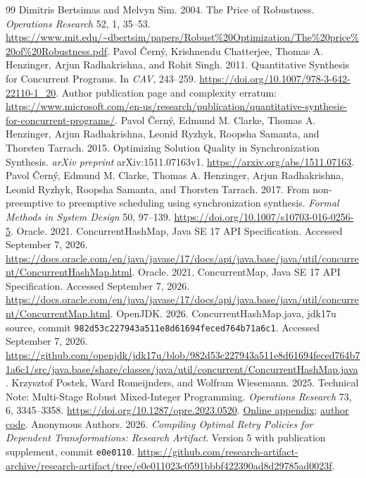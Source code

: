 \documentclass[acmsmall,screen,review,anonymous]{acmart}
\begin{document}
\begin{thebibliography}{99}
 Dimitris Bertsimas and Melvyn Sim. 2004. The Price of Robustness. \emph{Operations Research} 52, 1, 35--53. \url{https://www.mit.edu/~dbertsim/papers/Robust%20Optimization/The%20price%20of%20Robustness.pdf}.
 Pavol \v{C}ern\'y, Krishnendu Chatterjee, Thomas A. Henzinger, Arjun Radhakrishna, and Rohit Singh. 2011. Quantitative Synthesis for Concurrent Programs. In \emph{CAV}, 243--259. \url{https://doi.org/10.1007/978-3-642-22110-1_20}. Author publication page and complexity erratum: \url{https://www.microsoft.com/en-us/research/publication/quantitative-synthesis-for-concurrent-programs/}.
 Pavol \v{C}ern\'y, Edmund M. Clarke, Thomas A. Henzinger, Arjun Radhakrishna, Leonid Ryzhyk, Roopsha Samanta, and Thorsten Tarrach. 2015. Optimizing Solution Quality in Synchronization Synthesis. \emph{arXiv preprint} arXiv:1511.07163v1. \url{https://arxiv.org/abs/1511.07163}.
 Pavol \v{C}ern\'y, Edmund M. Clarke, Thomas A. Henzinger, Arjun Radhakrishna, Leonid Ryzhyk, Roopsha Samanta, and Thorsten Tarrach. 2017. From non-preemptive to preemptive scheduling using synchronization synthesis. \emph{Formal Methods in System Design} 50, 97--139. \url{https://doi.org/10.1007/s10703-016-0256-5}.
 Oracle. 2021. ConcurrentHashMap, Java SE 17 API Specification. Accessed September 7, 2026. \url{https://docs.oracle.com/en/java/javase/17/docs/api/java.base/java/util/concurrent/ConcurrentHashMap.html}.
 Oracle. 2021. ConcurrentMap, Java SE 17 API Specification. Accessed September 7, 2026. \url{https://docs.oracle.com/en/java/javase/17/docs/api/java.base/java/util/concurrent/ConcurrentMap.html}.
 OpenJDK. 2026. ConcurrentHashMap.java, jdk17u source, commit \texttt{982d53c227943a511e8d61694feced764b71a6c1}. Accessed September 7, 2026. \url{https://github.com/openjdk/jdk17u/blob/982d53c227943a511e8d61694feced764b71a6c1/src/java.base/share/classes/java/util/concurrent/ConcurrentHashMap.java}.
 Krzysztof Postek, Ward Romeijnders, and Wolfram Wiesemann. 2025. Technical Note: Multi-Stage Robust Mixed-Integer Programming. \emph{Operations Research} 73, 6, 3345--3358. \url{https://doi.org/10.1287/opre.2023.0520}. \href{https://pubsonline.informs.org/doi/suppl/10.1287/opre.2023.0520/suppl_file/opre.2023.0520.sm1.pdf}{Online appendix}; \href{https://www.doc.ic.ac.uk/~wwiesema/multi-stage-ro.zip}{author code}.
 Anonymous Authors. 2026. \emph{Compiling Optimal Retry Policies for Dependent Transformations: Research Artifact}. Version 5 with publication supplement, commit \texttt{e0e0110}. \url{https://github.com/research-artifact-archive/research-artifact/tree/e0e011023c0591bbbf422390ad8d29785ad0023f}.


\end{thebibliography}
\end{document}
